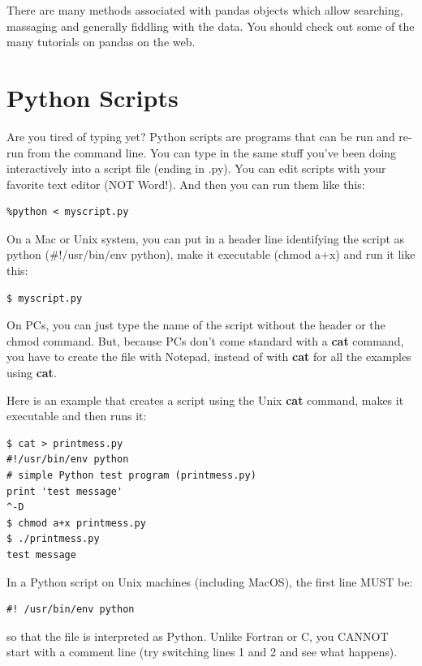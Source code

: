 \documentclass[11pt]{book}
\begin{document}
{{There are many methods associated with pandas objects which allow searching, massaging and generally fiddling with the data.   You should check out some of the many tutorials on pandas on the web.

\section{Python Scripts}

Are you tired of typing yet? Python scripts are programs that can be run and re-run from the command line.
You can type in the same stuff you've been doing interactively into a script file (ending in .py). You can edit scripts with your favorite text editor (NOT Word!).   And then you can run them like this:

{ \color{blue} \begin{verbatim}
%python < myscript.py
\end{verbatim}}

On a Mac or Unix system,  you can put in a header line identifying the script as python (\#!/usr/bin/env python), make  it executable (chmod a+x)  and   run it like this:

{ \color{blue} \begin{verbatim}
$ myscript.py
\end{verbatim}}

On PCs, you can just type the name of the script without the header or the chmod command.   But, because PCs don't come standard with a {\bf cat} command, you have to create the file with Notepad, instead of with {\bf cat} for all the examples using {\bf cat}.

Here is an example that creates a script using the Unix {\bf cat} command, makes it executable and then runs it:

{ \color{blue} \begin{verbatim}
$ cat > printmess.py
#!/usr/bin/env python
# simple Python test program (printmess.py)
print 'test message'
^-D
$ chmod a+x printmess.py
$ ./printmess.py
test message
\end{verbatim}}

\noindent
In a Python script on Unix machines (including MacOS), the  first line MUST be:

{ \color{blue} \begin{verbatim}
#! /usr/bin/env python
\end{verbatim}}

\noindent
so that the file is interpreted as Python.  Unlike Fortran or C, you CANNOT start with a
comment line (try switching lines 1 and 2 and see what happens).

}}
\end{document}

